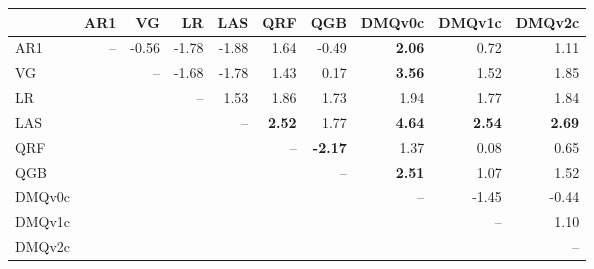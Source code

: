 \begin{tabular}{lrrrrrrrrr}
\toprule
 & AR1 & VG & LR & LAS & QRF & QGB & DMQv0c & DMQv1c & DMQv2c \\
\midrule
AR1 & -- & -0.56 & -1.78 & -1.88 & 1.64 & -0.49 & \textbf{2.06} & 0.72 & 1.11 \\
VG &  & -- & -1.68 & -1.78 & 1.43 & 0.17 & \textbf{3.56} & 1.52 & 1.85 \\
LR &  &  & -- & 1.53 & 1.86 & 1.73 & 1.94 & 1.77 & 1.84 \\
LAS &  &  &  & -- & \textbf{2.52} & 1.77 & \textbf{4.64} & \textbf{2.54} & \textbf{2.69} \\
QRF &  &  &  &  & -- & \textbf{-2.17} & 1.37 & 0.08 & 0.65 \\
QGB &  &  &  &  &  & -- & \textbf{2.51} & 1.07 & 1.52 \\
DMQv0c &  &  &  &  &  &  & -- & -1.45 & -0.44 \\
DMQv1c &  &  &  &  &  &  &  & -- & 1.10 \\
DMQv2c &  &  &  &  &  &  &  &  & -- \\
\bottomrule
\end{tabular}
